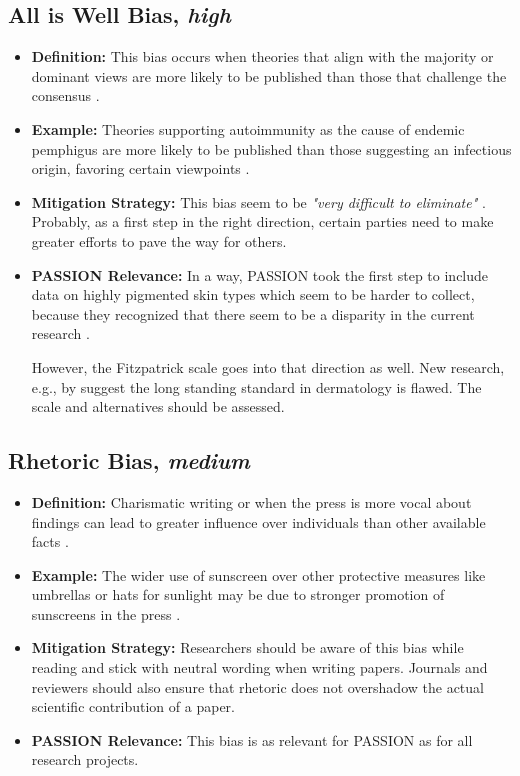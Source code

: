 \documentclass[12pt, a4paper, oneside]{book}   	%
\begin{document}
\begin{appendices}
		\subsection{All is Well Bias, \textit{high}}
		\begin{itemize}
			\item \textbf{Definition:} This bias occurs when theories that align with the majority or dominant views are more likely to be published than those that challenge the consensus \autocite{Chakraborty_2024}.
			\item \textbf{Example:} Theories supporting autoimmunity as the cause of endemic pemphigus are more likely to be published than those suggesting an infectious origin, favoring certain viewpoints \autocite{Chakraborty_2024}.
			\item \textbf{Mitigation Strategy:} This bias seem to be \textit{"very difficult to eliminate"} \autocite{Chakraborty_2024}. Probably, as a first step in the right direction, certain parties need to make greater efforts to pave the way for others.
			\item \textbf{PASSION Relevance:} In a way, PASSION took the first step to include data on highly pigmented skin types which seem to be harder to collect, because they recognized that there seem to be a disparity in the current research \autocite{Gottfrois2024}.
			
			However, the Fitzpatrick scale goes into that direction as well. New research, e.g., by \textcite{Montoya_2025} suggest the long standing standard in dermatology is flawed. The scale and alternatives should be assessed.
		\end{itemize}
		
		\subsection{Rhetoric Bias, \textit{medium}}
		\begin{itemize}
			\item \textbf{Definition:} Charismatic writing or when the press is more vocal about findings can lead to greater influence over individuals than other available facts \autocite{Chakraborty_2024}.
			\item \textbf{Example:} The wider use of sunscreen over other protective measures like umbrellas or hats for sunlight may be due to stronger promotion of sunscreens in the press \autocite{Chakraborty_2024}.
			\item \textbf{Mitigation Strategy:} Researchers should be aware of this bias while reading and stick with neutral wording when writing papers. Journals and reviewers should also ensure that rhetoric does not overshadow the actual scientific contribution of a paper.
			\item \textbf{PASSION Relevance:} This bias is as relevant for PASSION as for all research projects.
		\end{itemize}
		

\end{appendices}
\end{document}
